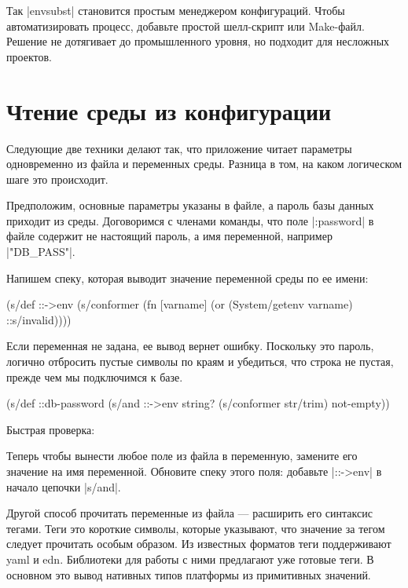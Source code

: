 Так \spverb|envsubst| становится простым менеджером конфигураций. Чтобы
автоматизировать процесс, добавьте простой шелл-скрипт или Make-файл. Решение не
дотягивает до промышленного уровня, но подходит для несложных проектов.

\section{Чтение среды из конфигурации}

Следующие две техники делают так, что приложение читает параметры одновременно
из файла и переменных среды. Разница в том, на каком логическом шаге это
происходит.

Предположим, основные параметры указаны в файле, а пароль базы данных приходит
из среды. Договоримся с членами команды, что поле \spverb|:password| в файле содержит не
настоящий пароль, а имя переменной, например \spverb|"DB_PASS"|.

Напишем спеку, которая выводит значение переменной среды по ее имени:

\begin{code}
(s/def ::->env
  (s/conformer
   (fn [varname]
     (or (System/getenv varname)
         ::s/invalid))))
\end{code}

Если переменная не задана, ее вывод вернет ошибку. Поскольку это пароль, логично
отбросить пустые символы по краям и убедиться, что строка не пустая, прежде чем
мы подключимся к базе.

\begin{code}
(s/def ::db-password
  (s/and ::->env
         string?
         (s/conformer str/trim)
         not-empty))
\end{code}

Быстрая проверка:

\begin{code}
(s/conform ::db-password "DB_PASS")
"*(&fd}A53z#$!"
\end{code}

Теперь чтобы вынести любое поле из файла в переменную, замените его значение на
имя переменной. Обновите спеку этого поля: добавьте \spverb|::->env| в начало цепочки
\spverb|s/and|.

Другой способ прочитать переменные из файла — расширить его синтаксис
тегами. Теги это короткие символы, которые указывают, что значение за тегом
следует прочитать особым образом. Из известных форматов теги поддерживают yaml и
edn. Библиотеки для работы с ними предлагают уже готовые теги. В основном это
вывод нативных типов платформы из примитивных значений.

